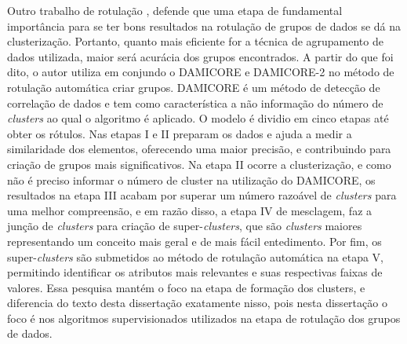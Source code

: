 Outro trabalho de rotulação \cite{Araujo2018}, defende que uma etapa de fundamental importância para se ter bons resultados na rotulação de grupos de dados se dá na clusterização. Portanto, quanto mais eficiente for a técnica de agrupamento de dados utilizada, maior será  acurácia dos grupos encontrados. A partir do que foi dito, o autor utiliza em conjundo o DAMICORE e DAMICORE-2 no método de rotulação automática criar grupos. DAMICORE é um método de detecção de correlação de dados e tem como característica a não informação do número de \textit{clusters} ao qual o algoritmo é aplicado. 
O modelo é dividio em cinco etapas até obter os rótulos. Nas etapas I e II preparam os dados e ajuda a medir a similaridade dos elementos, oferecendo uma maior precisão, e contribuindo para criação de grupos mais significativos. Na etapa II ocorre a clusterização, e como não é preciso informar o número de cluster na utilização do DAMICORE, os resultados na etapa III acabam por superar um número razoável de \textit{clusters} para uma melhor compreensão, e em razão disso, a etapa IV de mesclagem, faz a junção de \textit{clusters} para criação de super-\textit{clusters}, que são \textit{clusters} maiores representando um conceito mais geral e de mais fácil entedimento. Por fim, os super-\textit{clusters} são submetidos ao método de rotulação automática na etapa V, permitindo identificar os atributos mais relevantes e suas respectivas faixas de valores. Essa pesquisa mantém o foco na etapa de formação dos clusters, e diferencia do texto desta dissertação exatamente nisso, pois nesta dissertação o foco é nos algoritmos supervisionados utilizados na etapa de rotulação dos grupos de dados. 

